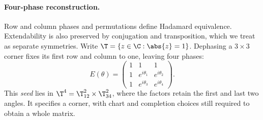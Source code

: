 \paragraph*{Four-phase reconstruction.}
Row and column phases and permutations define Hadamard equivalence. Extendability is also preserved by conjugation and transposition, which we treat as separate symmetries. Write $\T=\{z\in\C:\abs{z}=1\}$. Dephasing a $3\times3$ corner fixes its first row and column to one, leaving four phases:
\begin{equation}
 E(\theta)=\begin{pmatrix}1&1&1\\1&e^{i\theta_1}&e^{i\theta_2}\\1&e^{i\theta_3}&e^{i\theta_4}\end{pmatrix}.
 \label{eq:seed}
\end{equation}
This \emph{seed} lies in $\T^4=\T^2_{12}\times\T^2_{34}$, where the factors retain the first and last two angles. It specifies a corner, with chart and completion choices still required to obtain a whole matrix.

